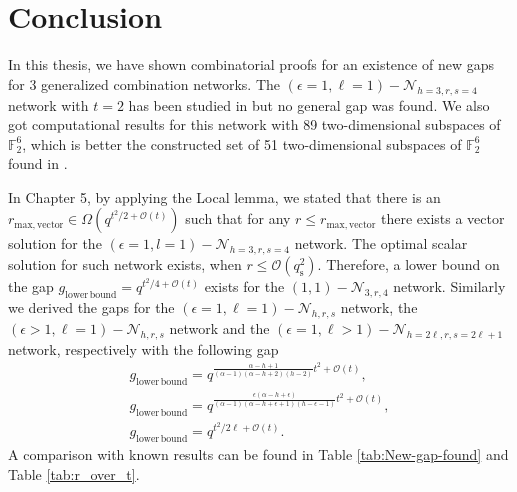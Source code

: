 \chapter{Conclusion} \label{chap:conclusion}

In this thesis, we have shown combinatorial proofs for an existence
of new gaps for 3 generalized combination networks. The $\left(\epsilon=1,\ell=1\right)-\mathcal{N}_{h=3,r,s=4}$
network with $t=2$ has been studied in \cite{Wachter-Zeh:2018,Etzion:2016,Zhang:2019,Etzion:2018}
but no general gap was found. We also got computational results for
this network with 89 two-dimensional subspaces of $\ensuremath{\mathbb{F}}_{2}^{6}$,
which is better the constructed set of 51 two-dimensional subspaces
of $\ensuremath{\mathbb{F}}_{2}^{6}$ found in \cite{Wachter-Zeh:2018}.

In Chapter 5, by applying the Local lemma, we stated that there is
an $r_{\mathrm{max,vector}}\in\Omega\left(q^{t^{2}/2+\mathcal{O}\left(t\right)}\right)$
such that for any $r\leq r_{\mathrm{max,vector}}$ there exists a
vector solution for the $\left(\epsilon=1,l=1\right)-\mathcal{N}_{h=3,r,s=4}$
network. The optimal scalar solution for such network exists, when
$r\leq\mathcal{O}\left(q_{\mathrm{s}}^{2}\right)$. Therefore, a lower
bound on the gap $g_{\mathrm{lower\,bound}}=q^{t^{2}/4+\mathcal{O}(t)}$
exists for the $\left(1,1\right)-\mathcal{N}_{3,r,4}$ network. Similarly
we derived the gaps for the $\left(\epsilon=1,\ell=1\right)-\mathcal{N}_{h,r,s}$
network, the $\left(\epsilon>1,\ell=1\right)-\mathcal{N}_{h,r,s}$
network and the $\left(\epsilon=1,\ell>1\right)-\mathcal{N}_{h=2\ell,r,s=2\ell+1}$
network, respectively with the following gap 
\[
\begin{array}{c}
g_{\mathrm{lower\,bound}}=q^{\frac{\alpha-h+1}{\left(\alpha-1\right)\left(\alpha-h+2\right)\left(h-2\right)}t^{2}+\mathcal{O}(t)},\\
g_{\mathrm{lower\,bound}}=q^{\frac{\epsilon\left(\alpha-h+\epsilon\right)}{\left(\alpha-1\right)\left(\alpha-h+\epsilon+1\right)\left(h-\epsilon-1\right)}t^{2}+\mathcal{O}(t)},\\
g_{\mathrm{lower\,bound}}=q^{t^{2}/2\ell+\mathcal{O}(t)}.
\end{array}
\]
A comparison with known results can be found in Table \ref{tab:New-gap-found}
and Table \ref{tab:r_over_t}.

